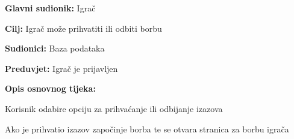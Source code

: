 					\noindent {}
					\begin{packed_item}
						
						\item \textbf{Glavni sudionik: }Igrač
						\item  \textbf{Cilj:} Igrač može prihvatiti ili odbiti borbu
						\item  \textbf{Sudionici:} Baza podataka
						\item  \textbf{Preduvjet:} Igrač je prijavljen
						\item  \textbf{Opis osnovnog tijeka:}
						
						\item[] \begin{packed_enum}
							
							\item Korisnik odabire opciju za prihvaćanje ili odbijanje izazova
							\item Ako je prihvatio izazov započinje borba te se otvara stranica za borbu igrača
						\end{packed_enum}
						
					\end{packed_item}
					
